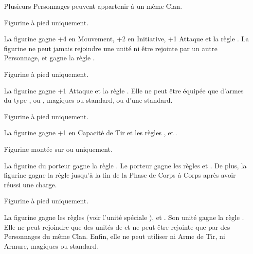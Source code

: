 \newpage
\begin{multicols}{2}\raggedcolumns
\startarmynewsection{\kindreds}

\spaceaftersection{}

Plusieurs Personnages peuvent appartenir à un même Clan.

\startpricelistNSP

Figurine à pied uniquement.

La figurine gagne +4 en Mouvement, +2 en Initiative, +1 Attaque et la règle . La figurine ne peut jamais rejoindre une unité ni être rejointe par un autre Personnage, et gagne la règle \notaleader{}.

Figurine à pied uniquement.

La figurine gagne +1 Attaque et la règle . Elle ne peut être équipée que d'armes du type \spear{}, \gw{} ou \sylvanblades{}, magiques ou standard, ou d'une \hw{} standard.

Figurine à pied uniquement.

La figurine gagne +1 en Capacité de Tir et les règles \scout{}, \masterarcher{} et .

Figurine montée sur \elvenhorse{} ou \greatelk{} uniquement.

La figurine du porteur gagne la règle \frenzy{}. Le porteur gagne les règles \devastatingcharge{} et \lighttroops{}. De plus, la figurine gagne la règle \fear{} jusqu'à la fin de la Phase de Corps à Corps après avoir réussi une charge.

Figurine à pied uniquement.

La figurine gagne les règles \dancesofcenyrn{} (voir l'unité spéciale \bladedancers{}), \immunetopsychology{} et . Son unité gagne la règle \swiftstride{}. Elle ne peut rejoindre que des unités de \bladedancers{} et ne peut être rejointe que par des Personnages du même Clan. Enfin, elle ne peut utiliser ni Arme de Tir, ni Armure, magiques ou standard.

\endpricelistNSP
\closearmynewsection

\vspace*{\fill}
\columnbreak

\startarmynewsection{\aspectsofnature}

\spaceaftersection{}


\end{multicols}
